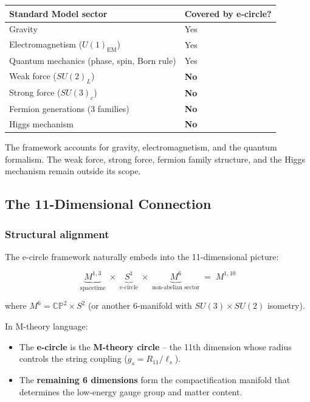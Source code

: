\documentclass[aps,prd,preprint,superscriptaddress,longbibliography,floatfix]{revtex4-2}
\theoremstyle{remark}
\begin{document}
\begin{table}[H]
\begin{ruledtabular}
\begin{tabular}{p{7.5cm}p{7.5cm}}
Standard Model sector & Covered by e-circle? \\
\hline
Gravity & Yes \\
Electromagnetism ($U(1)_{\text{EM}}$) & Yes \\
Quantum mechanics (phase, spin, Born rule) & Yes \\
Weak force ($SU(2)_L$) & \textbf{No} \\
Strong force ($SU(3)_c$) & \textbf{No} \\
Fermion generations (3 families) & \textbf{No} \\
Higgs mechanism & \textbf{No} \\
\end{tabular}
\end{ruledtabular}
\end{table}

The framework accounts for gravity, electromagnetism, and the quantum formalism. The weak force, strong force, fermion family structure, and the Higgs mechanism remain outside its scope.



\subsection{The 11-Dimensional Connection}


\subsubsection{Structural alignment}

The e-circle framework naturally embeds into the 11-dimensional picture:


\begin{equation}
    \underbrace{M^{1,3}}_{\text{spacetime}}
\;\times\;
\underbrace{S^1}_{\text{e-circle}}
\;\times\;
\underbrace{M^6}_{\text{non-abelian sector}}
\;=\;
M^{1,10}
\end{equation}

where $M^6 = \mathbb{CP}^2 \times S^2$ (or another 6-manifold with $SU(3) \times SU(2)$ isometry).

In M-theory language:

\begin{itemize}
  \item The \textbf{e-circle} is the \textbf{M-theory circle} -- the 11th dimension whose radius controls the string coupling ($g_s = R_{11} / \ell_s$).
  \item The \textbf{remaining 6 dimensions} form the compactification manifold that determines the low-energy gauge group and matter content.
\end{itemize}
\end{document}
